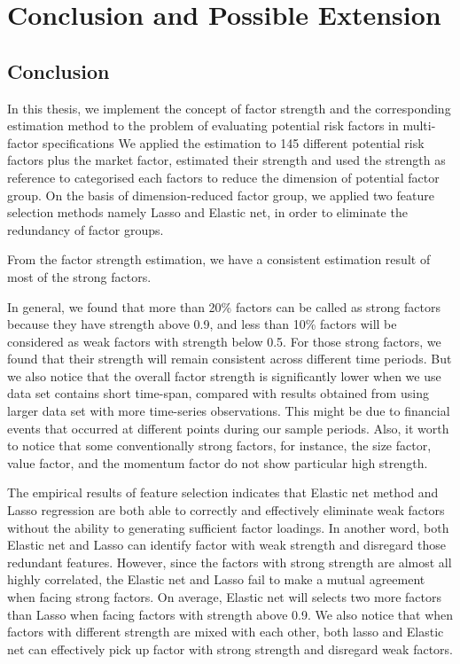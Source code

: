 	\chapter{Conclusion and Possible Extension}\label{Conclusion}
		\section{Conclusion}
In this thesis, we implement the concept of factor strength and the corresponding estimation method to the problem of evaluating potential risk factors in multi-factor specifications 
We applied the estimation to 145 different potential risk factors plus the market factor, estimated their strength and used the strength as reference to categorised each factors to reduce the dimension of potential factor group.
On the basis of dimension-reduced factor group, we applied two feature selection methods namely Lasso and Elastic net, in order to eliminate the redundancy of factor groups. 

From the factor strength estimation, we have a consistent estimation result of most of the strong factors.

In general, we found that more than 20\% factors can be called as strong factors because they have strength above 0.9, and less than 10\% factors will be considered as weak factors with strength below 0.5.
For those strong factors, we found that their strength will remain consistent across different time periods.
But we also notice that the overall factor strength is significantly lower when we use data set contains short time-span, compared with results obtained from using larger data set with more time-series observations.
This might be due to financial events that occurred at different points during our sample periods.
Also, it worth to notice that some conventionally strong factors, for instance, the size factor, value factor, and the momentum factor do not show particular high strength.

The empirical results of feature selection indicates that Elastic net method and Lasso regression are both able to correctly and effectively eliminate weak factors without the ability to generating sufficient factor loadings.
In another word, both Elastic net and Lasso can identify factor with weak strength and disregard those redundant features.
However, since the factors with strong strength are almost all highly correlated, the Elastic net and Lasso fail to make a mutual agreement when facing strong factors.
On average, Elastic net will selects two more factors than Lasso when facing factors with strength above 0.9.
We also notice that when factors with different strength are mixed with each other, both lasso and Elastic net can effectively pick up factor with strong strength and disregard weak factors.


